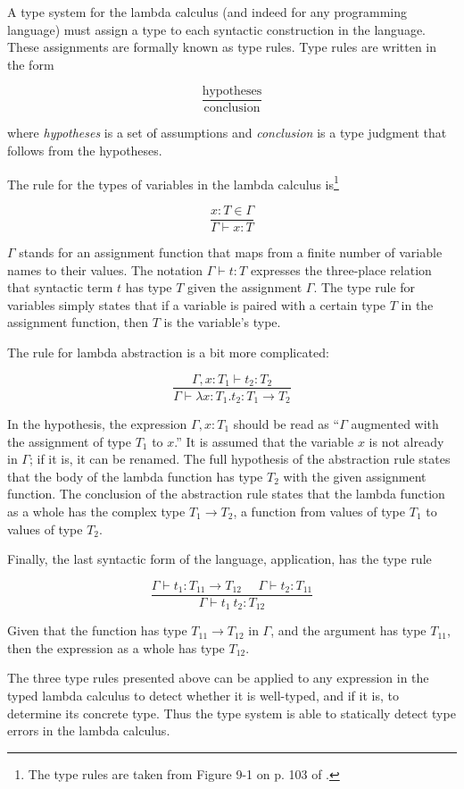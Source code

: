 \documentclass{article}
\begin{document}
A type system for the lambda calculus (and indeed for any programming language) must assign a type to each syntactic construction in the language. These assignments are formally known as type rules. Type rules are written in the form

\[
\frac{\text{hypotheses}}
{\text{conclusion}}
\]

\noindent where \textit{hypotheses} is a set of assumptions and \textit{conclusion} is a type judgment that follows from the hypotheses.

The rule for the types of variables in the lambda calculus is\footnote{The type rules are taken from Figure 9-1 on p. 103 of \cite{types}.}

\[
\frac{x : T \in \Gamma}
{\Gamma \vdash x : T}
\]

$\Gamma$ stands for an assignment function that maps from a finite number of variable names to their values. The notation $\Gamma \vdash t : T$ expresses the three-place relation that syntactic term $t$ has type $T$ given the assignment $\Gamma$. The type rule for variables simply states that if a variable is paired with a certain type $T$ in the assignment function, then $T$ is the variable's type.

The rule for lambda abstraction is a bit more complicated:

\[
\frac{\Gamma, x : T_1 \vdash t_2 : T_2}
{\Gamma \vdash \lambda x : T_1 . t_2 : T_1 \to T_2}
\]

In the hypothesis, the expression $\Gamma, x : T_1$ should be read as ``$\Gamma$ augmented with the assignment of type $T_1$ to $x$.'' It is assumed that the variable $x$ is not already in $\Gamma$; if it is, it can be renamed. The full hypothesis of the abstraction rule states that the body of the lambda function has type $T_2$ with the given assignment function. The conclusion of the abstraction rule states that the lambda function as a whole has the complex type $T_1 \to T_2$, a function from values of type $T_1$ to values of type $T_2$.

Finally, the last syntactic form of the language, application, has the type rule

\[
\frac{\Gamma \vdash t_1 : T_{11} \to T_{12}\ \ \ \ \ \ \Gamma \vdash t_2 : T_{11}}
{\Gamma \vdash t_1\ t_2 : T_{12}}
\]

Given that the function has type $T_{11} \to T_{12}$ in $\Gamma$, and the argument has type $T_{11}$, then the expression as a whole has type $T_{12}$.

The three type rules presented above can be applied to any expression in the typed lambda calculus to detect whether it is well-typed, and if it is, to determine its concrete type. Thus the type system is able to statically detect type errors in the lambda calculus.
\end{document}
